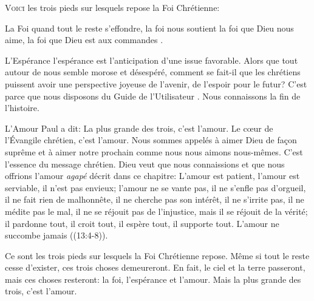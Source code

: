 



\lettrine[lhang=0.8]{V}{oici} les trois pieds sur lesquels
 repose la Foi Chrétienne:

La Foi \ocadr quand tout le reste s'effondre, la foi nous soutient \fcadr{}
 la foi que Dieu nous aime, la foi que Dieu est \Og aux commandes \Fg{}.

L'Espérance \ocadr l'espérance est l'anticipation d'une issue favorable.
 Alors que tout autour de nous semble morose et désespéré,
 comment se fait-il que les chrétiens puissent avoir une perspective
 joyeuse de l'avenir, de l'espoir pour le futur?
 C'est parce que nous disposons du \Og Guide de l'Utilisateur \Fg.
 Nous connaissons la fin de l'histoire.


L'Amour \ocadr Paul a dit: 
 \Og La plus grande des trois, c'est l'amour. \Fg{}
 Le c\oe{}ur de l'Évangile chrétien, c'est l'amour.
 Nous sommes appelés à aimer Dieu de fa\c{c}on suprême
 et à aimer notre prochain comme nous nous aimons nous-mêmes.
 C'est l'essence du message chrétien.
 Dieu veut que nous connaissions et que nous offrions
 l'amour \emph{agapé}  décrit dans ce chapitre:
 \Og L'amour est patient, l'amour est serviable,
 il n'est pas envieux; l'amour ne se vante pas,
 il ne s'enfle pas d'orgueil, il ne fait rien de malhonnête,
 il ne cherche pas son intérêt, il ne s'irrite pas,
 il ne médite pas le mal, il ne se réjouit pas de l'injustice,
 mais il se réjouit de la vérité;
 il pardonne tout, il croit tout, il espère tout,
 il supporte tout. L'amour ne succombe jamais \Fg{}
 ((13:4-8)). 

Ce sont les trois pieds sur lesquels la Foi Chrétienne repose. 
 Même si tout le reste cesse d'exister, ces trois choses demeureront.
 En fait, le ciel et la terre passeront, mais ces choses resteront:
 la foi, l'espérance et l'amour.
 Mais la plus grande des trois, c'est l'amour.

